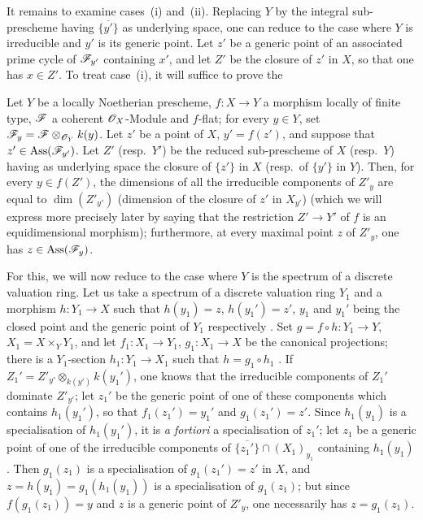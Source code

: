 \begin{env}[12.1.1.4]
\label{IV.12.1.1.4}
It remains to examine cases~(i) and~(ii).
Replacing $Y$ by the integral sub-prescheme having $\overline{\{y'\}}$ as underlying space, one can reduce to the case where $Y$ is irreducible and $y'$ is its generic point. Let $z'$ be a generic point of an associated prime cycle of $\mathscr{F}_{y'}$
containing $x'$, and let $Z'$ be the closure of $z'$ in $X$, so that one has $x\in Z'$.
To treat case~(i), it will suffice to prove the

\begin{proposition}[12.1.1.5]
\label{IV.12.1.1.5}
Let $Y$ be a locally Noetherian prescheme, $f:X\to Y$ a morphism locally of finite type, $\mathscr{F}$ a coherent $\mathscr{O}_X$-Module and $f$-flat; for every $y\in Y$, set $\mathscr{F}_y=\mathscr{F}\otimes_{\mathscr{O}_Y}k(y)$.
Let $z'$ be a point of $X$, $y'=f(z')$, and suppose that $z'\in\operatorname{Ass}(\mathscr{F}_{y'})$.
Let $Z'$ \textnormal{(}resp.\ $Y'$\textnormal{)} be the reduced sub-prescheme of $X$ \textnormal{(}resp.\ $Y$\textnormal{)} having as underlying space the closure of $\{z'\}$ in $X$ \textnormal{(}resp.\ of $\{y'\}$ in $Y$\textnormal{)}.
Then, for every $y\in f(Z')$, the dimensions of all the irreducible components of $Z'_y$ are equal to $\dim(Z'_{y'})$ \textnormal{(}dimension of the closure of $z'$ in $X_{y'}$\textnormal{)} \textnormal{(}which we will express more precisely later  by saying that the restriction $Z'\to Y'$ of $f$ is an equidimensional morphism\textnormal{)}; furthermore, at every maximal point $z$ of $Z'_y$, one has $z\in\operatorname{Ass}(\mathscr{F}_y)$.
\end{proposition}

For this, we will now reduce to the case where $Y$ is the spectrum of a discrete valuation ring.
Let us take a spectrum of a discrete valuation ring $Y_1$ and a morphism $h:Y_1\to X$ such that $h(y_1)=z$, $h(y_1')=z'$, $y_1$ and $y_1'$ being the closed point and the generic point of $Y_1$ respectively .
Set $g=f\circ h:Y_1\to Y$, $X_1=X\times_Y Y_1$, and let $f_1:X_1\to Y_1$, $g_1:X_1\to X$ be the canonical projections; there is a $Y_1$-section $h_1:Y_1\to X_1$ such that $h=g_1\circ h_1$ .
If $Z_1'=Z'_{y'}\otimes_{k(y')}k(y_1')$, one knows  that the irreducible components of $Z_1'$ dominate $Z'_{y'}$; let $z_1'$ be the generic point of one of these components which contains $h_1(y_1')$, so that $f_1(z_1')=y_1'$ and $g_1(z_1')=z'$.
Since $h_1(y_1)$ is a specialisation of $h_1(y_1')$, it is \emph{a fortiori} a specialisation of $z_1'$; let $z_1$ be a generic point of one of the irreducible components of $\overline{\{z_1'\}}\cap(X_1)_{y_1}$ containing $h_1(y_1)$.
Then $g_1(z_1)$ is a specialisation of $g_1(z_1')=z'$ in $X$, and $z=h(y_1)=g_1(h_1(y_1))$ is a specialisation of $g_1(z_1)$; but since $f(g_1(z_1))=y$ and $z$ is a generic point of $Z'_y$, one necessarily has $z=g_1(z_1)$.


\end{env}
